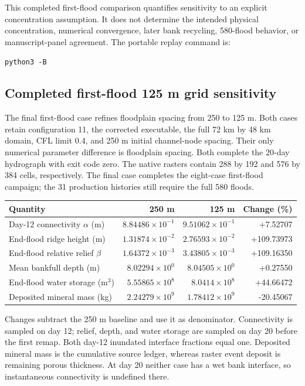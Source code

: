 This completed first-flood comparison quantifies sensitivity to an
explicit concentration assumption. It does not determine the intended
physical concentration, numerical convergence, later bank recycling,
580-flood behavior, or manuscript-panel agreement.
The portable replay command is:
\par\noindent\texttt{python3 -B}\ 

\subsection{Completed first-flood 125 m grid sensitivity}
The final first-flood case refines floodplain spacing from 250 to 125 m.
Both cases retain configuration 11, the corrected executable, the full
72 km by 48 km domain, CFL limit 0.4, and 250 m initial channel-node
spacing. Their only numerical parameter difference is floodplain
spacing. Both complete the 20-day hydrograph with exit code zero.
The native rasters contain 288 by 192 and 576 by 384 cells, respectively.
The final case completes the eight-case first-flood campaign;
the 31 production histories still require the full 580 floods.

\begin{center}\small\setlength{\tabcolsep}{4pt}
\begin{tabular}{lrrr}
\toprule
Quantity & 250 m & 125 m & Change (\%) \\
\midrule
Day-12 connectivity $\alpha$ (m) & $8.84486\times10^{-1}$ & $9.51062\times10^{-1}$ & +7.52707 \\
End-flood ridge height (m) & $1.31874\times10^{-2}$ & $2.76593\times10^{-2}$ & +109.73973 \\
End-flood relative relief $\beta$ & $1.64372\times10^{-3}$ & $3.43805\times10^{-3}$ & +109.16350 \\
Mean bankfull depth (m) & $8.02294\times10^{0}$ & $8.04505\times10^{0}$ & +0.27550 \\
End-flood water storage (m$^3$) & $5.55865\times10^{8}$ & $8.0414\times10^{8}$ & +44.66472 \\
Deposited mineral mass (kg) & $2.24279\times10^{9}$ & $1.78412\times10^{9}$ & -20.45067 \\
\bottomrule\end{tabular}\end{center}
Changes subtract the 250 m baseline and use it as denominator.
Connectivity is sampled on day 12; relief, depth, and water storage
are sampled on day 20 before the first remap. Both day-12 inundated
interface fractions equal one. Deposited mineral mass is the cumulative
source ledger, whereas raster event deposit is remaining porous
thickness. At day 20 neither case has a wet bank interface, so
instantaneous connectivity is undefined there.

